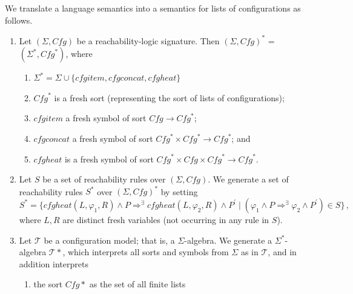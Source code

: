 \documentclass{article}
\begin{document}
\begin{definition}
We translate a language semantics into a semantics for lists of configurations as follows.
\begin{enumerate}
    \item Let $(\Sigma, \mathit{Cfg})$ be a reachability-logic signature.
          Then $(\Sigma, \mathit{Cfg})^*$ = $(\Sigma^*, \mathit{Cfg}^*)$,
          where
          \begin{enumerate}
              \item $\Sigma^* = \Sigma \cup \{ \mathit{cfgitem}, \mathit{cfgconcat},
          \mathit{cfgheat} \}$
              \item $\mathit{Cfg}^*$ is a fresh sort (representing the sort of lists of configurations);
              \item $\mathit{cfgitem}$ a fresh symbol of sort $\mathit{Cfg} \to \mathit{Cfg}^*$;
              \item $\mathit{cfgconcat}$ a fresh symbol of sort $\mathit{Cfg}^* \times \mathit{Cfg}^* \to \mathit{Cfg}^*$; and
              \item $\mathit{cfgheat}$ is a fresh symbol of sort $\mathit{Cfg}^* \times \mathit{Cfg} \times \mathit{Cfg}^* \to \mathit{Cfg}^*$.
          \end{enumerate}
    \item Let $S$ be a set of reachability rules over $(\Sigma, \mathit{Cfg})$.
          We generate a set of reachability rules $S^*$ over $(\Sigma, \mathit{Cfg})^*$
          by setting
          \begin{equation*}
              S^* = \{ \mathit{cfgheat}(L, \varphi_1, R) \land P \Rightarrow^\exists \mathit{cfgheat}(L, \varphi_2, R) \land P^\prime \mid (\varphi_1 \land P \Rightarrow^\exists \varphi_2 \land P^\prime) \in S \} \, ,
          \end{equation*}
          where $L,R$ are distinct fresh variables (not occurring in any rule in $S$).
    \item Let $\mathcal{T}$ be a configuration model; that is, a $\Sigma$-algebra.
          We generate a $\Sigma^*$-algebra $\mathcal{T}*$, which interprets all sorts and symbols from
          $\Sigma$ as in $\mathcal{T}$, and in addition interprets
          \begin{enumerate}
              \item the sort $\mathit{Cfg}*$ as the set of all finite lists

\end{enumerate}
\end{enumerate}
\end{definition}
\end{document}
